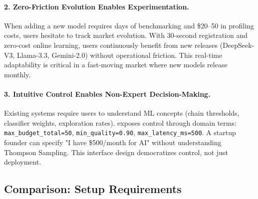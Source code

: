 \paragraph{2. Zero-Friction Evolution Enables Experimentation.}
When adding a new model requires days of benchmarking and \$20--50 in profiling costs, users hesitate to track market evolution. With 30-second registration and zero-cost online learning, users continuously benefit from new releases (DeepSeek-V3, Llama-3.3, Gemini-2.0) without operational friction. This real-time adaptability is critical in a fast-moving market where new models release monthly.

\paragraph{3. Intuitive Control Enables Non-Expert Decision-Making.}
Existing systems require users to understand ML concepts (chain thresholds, classifier weights, exploration rates). \ours{} exposes control through domain terms: \texttt{max\_budget\_total=50}, \texttt{min\_quality=0.90}, \texttt{max\_latency\_ms=500}. A startup founder can specify "I have \$500/month for AI" without understanding Thompson Sampling. This interface design democratizes control, not just deployment.

\subsection{Comparison: Setup Requirements}

\begin{table}[t]
\centering
\small
\caption{\textbf{Accessibility Comparison.} We prioritize ease of deployment to expand the user base beyond ML experts.}
\label{tab:accessibility_comparison}
\end{table}

